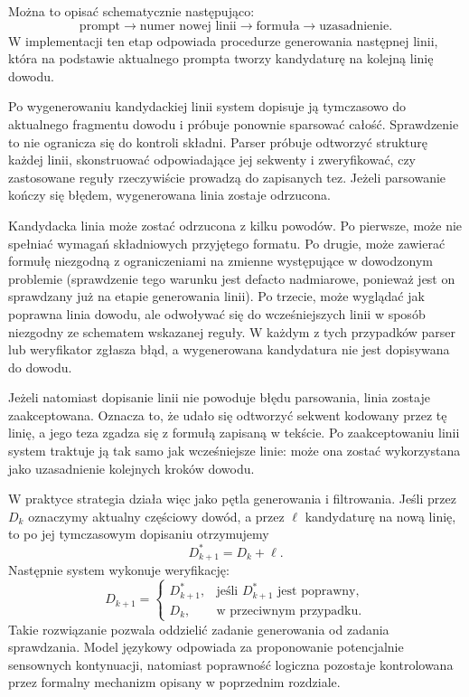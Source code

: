 \documentclass[shortabstract]{iithesis}
\theoremstyle{definition}
\theoremstyle{remark}
\theoremstyle{plain}
\begin{document}
Można to opisać schematycznie następująco:
\[
\text{prompt}
\longrightarrow
\text{numer nowej linii}
\longrightarrow
\text{formuła}
\longrightarrow
\text{uzasadnienie}.
\]
W implementacji ten etap odpowiada procedurze generowania następnej linii, która
na podstawie aktualnego prompta tworzy kandydaturę na kolejną linię dowodu.

Po wygenerowaniu kandydackiej linii system dopisuje ją tymczasowo do aktualnego
fragmentu dowodu i próbuje ponownie sparsować całość. Sprawdzenie to nie ogranicza
się do kontroli składni. Parser próbuje odtworzyć strukturę każdej linii,
skonstruować odpowiadające jej sekwenty i zweryfikować, czy zastosowane reguły
rzeczywiście prowadzą do zapisanych tez. Jeżeli parsowanie kończy się błędem,
wygenerowana linia zostaje odrzucona.

Kandydacka linia może zostać odrzucona z kilku powodów. Po pierwsze, może nie
spełniać wymagań składniowych przyjętego formatu. Po drugie, może zawierać
formułę niezgodną z ograniczeniami na zmienne występujące w dowodzonym problemie
(sprawdzenie tego warunku jest defacto nadmiarowe, ponieważ jest on sprawdzany już na etapie generowania linii).
Po trzecie, może wyglądać jak poprawna linia dowodu, ale odwoływać się do
wcześniejszych linii w sposób niezgodny ze schematem wskazanej reguły. W każdym
z tych przypadków parser lub weryfikator zgłasza błąd, a wygenerowana kandydatura
nie jest dopisywana do dowodu.

Jeżeli natomiast dopisanie linii nie powoduje błędu parsowania, linia zostaje
zaakceptowana. Oznacza to, że udało się odtworzyć sekwent kodowany przez tę linię,
a jego teza zgadza się z formułą zapisaną w tekście. Po zaakceptowaniu linii system
traktuje ją tak samo jak wcześniejsze linie: może ona zostać wykorzystana jako
uzasadnienie kolejnych kroków dowodu.

W praktyce strategia działa więc jako pętla generowania i filtrowania. Jeśli przez
\(D_k\) oznaczymy aktualny częściowy dowód, a przez \(\ell\) kandydaturę na nową
linię, to po jej tymczasowym dopisaniu otrzymujemy
\[
D_{k+1}^{\ast}=D_k+\ell.
\]
Następnie system wykonuje weryfikację:
\[
D_{k+1}=
\begin{cases}
D_{k+1}^{\ast}, & \text{jeśli } D_{k+1}^{\ast} \text{ jest poprawny},\\
D_k, & \text{w przeciwnym przypadku.}
\end{cases}
\]
Takie rozwiązanie pozwala oddzielić zadanie generowania od zadania sprawdzania.
Model językowy odpowiada za proponowanie potencjalnie sensownych kontynuacji,
natomiast poprawność logiczna pozostaje kontrolowana przez formalny mechanizm
opisany w poprzednim rozdziale.
\end{document}
